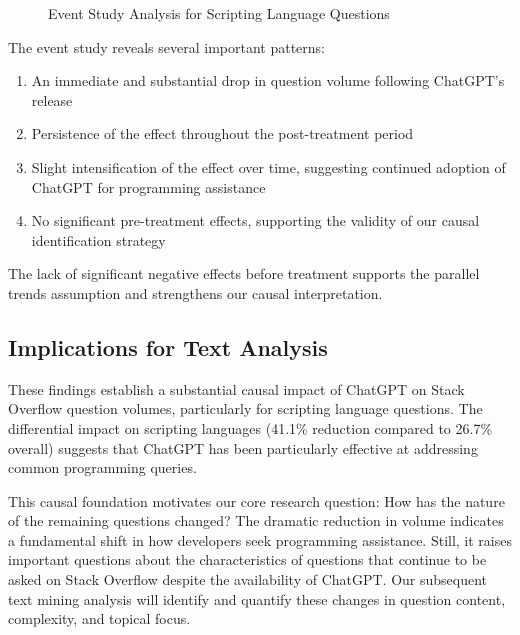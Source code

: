 \begin{figure}[htpb!]
    \centering
    
    \caption{Event Study Analysis for Scripting Language Questions}
    \label{fig:event_study}
\end{figure}

The event study reveals several important patterns:

\begin{enumerate}
    \item An immediate and substantial drop in question volume following ChatGPT's release
    \item Persistence of the effect throughout the post-treatment period
    \item Slight intensification of the effect over time, suggesting continued adoption of ChatGPT for programming assistance
    \item No significant pre-treatment effects, supporting the validity of our causal identification strategy
\end{enumerate}

The lack of significant negative effects before treatment supports the parallel trends assumption and strengthens our causal interpretation.

\subsection{Implications for Text Analysis}

These findings establish a substantial causal impact of ChatGPT on Stack Overflow question volumes, particularly for scripting language questions. The differential impact on scripting languages (41.1\% reduction compared to 26.7\% overall) suggests that ChatGPT has been particularly effective at addressing common programming queries.

This causal foundation motivates our core research question: How has the nature of the remaining questions changed? The dramatic reduction in volume indicates a fundamental shift in how developers seek programming assistance. Still, it raises important questions about the characteristics of questions that continue to be asked on Stack Overflow despite the availability of ChatGPT. Our subsequent text mining analysis will identify and quantify these changes in question content, complexity, and topical focus.